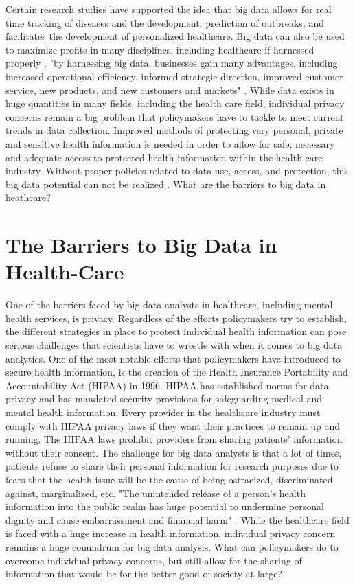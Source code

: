 \documentclass[sigconf]{acmart}
\begin{document}
Certain research studies have supported the idea that big data allows for real time tracking of diseases and the development, prediction of outbreaks, and facilitates the development of personalized healthcare. Big data can also be used to maximize profits in many disciplines, including healthcare if harnessed properly \cite{van2011health}. "by harnessing big data, businesses gain many advantages, including increased operational efficiency, informed strategic direction, improved customer service, new products, and new customers and markets" \cite{khan2014big}. While data exists in huge quantities in many fields, including the health care field, individual privacy concerns remain a big problem that policymakers have to tackle to meet current trends in data collection. Improved methods of protecting very personal, private and sensitive health information is needed in order to allow for safe, necessary and adequate access to protected health information within the health care industry. Without proper policies related to data use, access, and protection, this big data potential can not be realized \cite{roski2014creating}. What are the barriers to big data in heathcare? 


\section{The Barriers to Big Data in Health-Care}

One of the barriers faced by big data analysts in healthcare, including mental health services, is privacy. Regardless of the efforts policymakers try to establish, the different strategies in place to protect individual health information can pose serious challenges that scientists have to wrestle with when it comes to big data analytics. One of the most notable efforts that policymakers have introduced to secure health information, is the creation of the Health Insurance Portability and Accountability Act (HIPAA) in 1996. HIPAA has established norms for data privacy and has mandated security provisions for safeguarding medical and mental health information. Every provider in the healthcare industry must comply with HIPAA privacy laws if they want their practices to remain up and running. The HIPAA laws prohibit providers from sharing patients' information without their consent. The challenge for big data analysts is that a lot of times, patients refuse to share their personal information for research purposes due to fears that the health issue will be the cause of being ostracized, discriminated against, marginalized, etc. "The unintended release of a person's health information into the public realm has huge potential to undermine personal dignity and cause embarrassment and financial harm" \cite{van2011health}. While the healthcare field is faced with a huge increase in health information, individual privacy concern remains a huge conundrum for big data analysis. What can policymakers do to overcome individual privacy concerns, but still allow for the sharing of information that would be for the better good of society at large?
\end{document}
